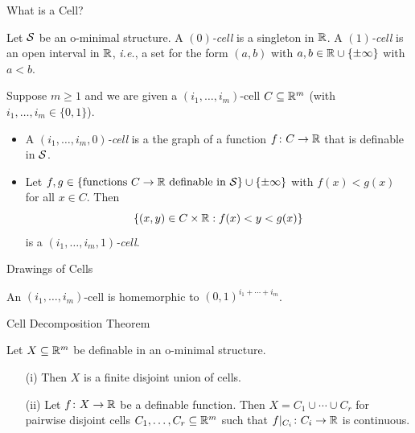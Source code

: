 \documentclass{beamer}
\begin{document}
\begin{frame}{What is a Cell?}
  \begin{definition}
    Let ${\mathcal S}$ be an o-minimal structure. 
    A \emph{$(0)$-cell} is a singleton in ${\mathbb{R}}$. A \emph{$(1)$-cell} is an open
    interval in ${\mathbb{R}}$, \textit{i.e.}, a set for the form $(a,b)$ with
    $a,b\in {\mathbb{R}}\cup\{\pm\infty\}$ with $a<b$.

    Suppose $m\ge 1$ and we are given a $(i_1,\ldots,i_m)$-cell
    $C\subseteq{\mathbb{R}}^m$
    (with $i_1,\ldots,i_m\in
    \{0,1\}$).  
    \begin{itemize}
    \item A \emph{$(i_1,\ldots,i_m,0)$-cell} is a the graph of a function
      $f\colon C\rightarrow {\mathbb{R}}$ that is definable in ${\mathcal S}$.
    \item Let $f,g\in \{\text{functions }C\rightarrow {\mathbb{R}} \text{ definable
        in ${\mathcal S}$}\}\cup\{\pm\infty\}$  with $f(x) < g(x)$ for all $x\in C$. 
      Then
      \begin{equation*}
        \{(x,y)\in C\times {\mathbb{R}} : f(x) < y <
        g(x)  \}
      \end{equation*}
      is a \emph{$(i_1,\ldots,i_m,1)$-cell}.
    \end{itemize}
  \end{definition}
\end{frame}

\begin{frame}{Drawings of Cells}

  \vspace{7cm}
  An $(i_1,\ldots,i_m)$-cell is homemorphic to $(0,1)^{i_1+\cdots+i_m}$.
\end{frame}

\begin{frame}{Cell Decomposition Theorem}
  \begin{theorem}
    Let $X\subseteq{\mathbb{R}}^m$ be
    definable in an o-minimal structure.
    \begin{enumerate}
    \item [(i)] Then $X$ is a
      finite disjoint union of cells.
    \item[(ii)] Let $f\colon X\rightarrow{\mathbb{R}}$ be 
      a definable function. Then $X=C_1\cup\cdots \cup C_r$ for pairwise
      disjoint cells $C_1,\ldots,C_r\subseteq{\mathbb{R}}^m$ such that
      $f|_{C_i}\colon C_i\rightarrow{\mathbb{R}}$ is continuous. 
    \end{enumerate}
  \end{theorem}
\end{frame}
\end{document}
